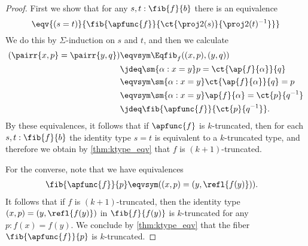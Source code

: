 \begin{proof}
First we show that for any $s,t:\fib{f}{b}$ there is an equivalence
\begin{equation*}
\eqv{(s=t)}{\fib{\apfunc{f}}{\ct{\proj 2(s)}{\proj 2(t)^{-1}}}}
\end{equation*}
We do this by $\Sigma$-induction on $s$ and $t$, and then we calculate
\begin{align*}
(\pairr{x,p}=\pairr{y,q}) & \eqvsym \Eqfib_f((x,p),(y,q)) \\
  & \jdeq \sm{\alpha:x=y} p=\ct{\ap{f}{\alpha}}{q} \\
  & \eqvsym \sm{\alpha:x=y} \ct{\ap{f}{\alpha}}{q}=p \\
& \eqvsym \sm{\alpha:x=y} \ap{f}{\alpha}=\ct{p}{q^{-1}} \\
& \jdeq \fib{\apfunc{f}}{\ct{p}{q^{-1}}}.
\end{align*}
By these equivalences, it follows that if $\apfunc{f}$ is $k$-truncated, then for each $s,t:\fib{f}{b}$ the identity type $s=t$ is equivalent to a $k$-truncated type, and therefore we obtain by \cref{thm:ktype_eqv} that $f$ is $(k+1)$-truncated.

For the converse, note that we have equivalences
\begin{align*}
\fib{\apfunc{f}}{p} & \eqvsym ((x,p)=(y,\refl{f(y)})).
\end{align*}
It follows that if $f$ is $(k+1)$-truncated, then the identity type $(x,p)=(y,\refl{f(y)})$ in $\fib{f}{f(y)}$ is $k$-truncated for any $p:f(x)=f(y)$. We conclude by \cref{thm:ktype_eqv} that the fiber $\fib{\apfunc{f}}{p}$ is $k$-truncated. 
\end{proof}

